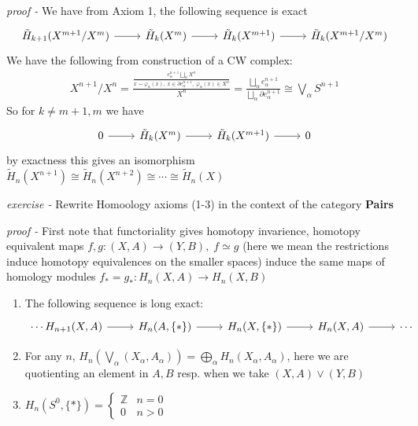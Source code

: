 \documentclass[11pt]{article}
\theoremstyle{definition}
\newcommand{\set}[1]{\{#1\}}
\begin{document}
    \emph{proof - } We have from Axiom 1, the following sequence is exact
    \begin{equation*}
        \begin{tikzcd}
            \tilde{H}_{k+1}(X^{m+1}/X^m) \arrow[r] & \tilde{H}_{k}(X^m) \arrow[r] & \tilde{H}_{k}(X^{m+1}) \arrow[r] & \tilde{H}_{k}(X^{m+1}/X^m)
        \end{tikzcd}
    \end{equation*}
    We have the following from construction of a CW complex:
    \begin{align*}
        X^{n+1}/X^n = \frac{\frac{e_\alpha^{n+1} \bigsqcup_\alpha X^n}{x \sim \varphi_\alpha(x),\; x \in \partial e_\alpha^{n+1},\; \varphi_\alpha(x) \in X^n}}{X^n} = \frac{\bigsqcup_\alpha e_\alpha^{n+1}}{\bigsqcup_{\alpha}\partial e_\alpha^{n+1}} \cong \bigvee_\alpha S^{n+1}
    \end{align*}
    So for \(k \neq m+1,m\) we have
    \begin{equation*}
        \begin{tikzcd}
            0 \arrow[r] & \tilde{H}_{k}(X^m) \arrow[r] & \tilde{H}_{k}(X^{m+1}) \arrow[r] & 0
        \end{tikzcd}
    \end{equation*}
    by exactness this gives an isomorphism \(\tilde{H}_n(X^{n+1}) \cong \tilde{H}_n(X^{n+2}) \cong \cdots \cong \tilde{H}_n(X)\)
    


    \emph{exercise - }\label{HEx15} Rewrite Homoology axioms (1-3) in the context of the category \textbf{Pairs}

    \emph{proof - } First note that functoriality gives homotopy invarience, homotopy equivalent maps \(f,g:(X,A) \to (Y,B), \; f \simeq g\) (here we mean the restrictions induce homotopy equivalences on the smaller spaces) induce the same maps of homology modules \(f_* = g_*: H_n(X,A) \to H_n(X,B)\)
    \begin{enumerate}
        \item The following sequence is long exact:
        \begin{equation*}
            \begin{tikzcd}
                \cdots H_{n+1}(X,A) \arrow[r] & H_n(A,\set{*}) \arrow[r] & H_n(X,\set{*}) \arrow[r] &H_n(X,A) \arrow[r] &\cdots
            \end{tikzcd}
        \end{equation*}
        \item For any \(n\), \(H_n\left(\bigvee_\alpha (X_\alpha,A_\alpha)\right) = \bigoplus_\alpha H_n(X_\alpha,A_\alpha)\), here we are quotienting an element in \(A, B\) resp. when we take \((X,A)\vee(Y,B)\)
        \item \(H_n(S^0,\set{*}) = \begin{cases}
            \mathbb{Z} & n=0 \\ 0 & n > 0
        \end{cases}\)
    \end{enumerate}
\end{document}
